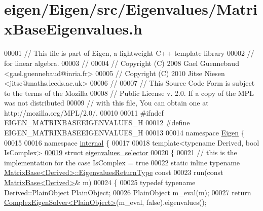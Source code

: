 \hypertarget{eigen_2_eigen_2src_2_eigenvalues_2_matrix_base_eigenvalues_8h_source}{}\section{eigen/\+Eigen/src/\+Eigenvalues/\+Matrix\+Base\+Eigenvalues.h}
\label{eigen_2_eigen_2src_2_eigenvalues_2_matrix_base_eigenvalues_8h_source}

\begin{DoxyCode}
00001 \textcolor{comment}{// This file is part of Eigen, a lightweight C++ template library}
00002 \textcolor{comment}{// for linear algebra.}
00003 \textcolor{comment}{//}
00004 \textcolor{comment}{// Copyright (C) 2008 Gael Guennebaud <gael.guennebaud@inria.fr>}
00005 \textcolor{comment}{// Copyright (C) 2010 Jitse Niesen <jitse@maths.leeds.ac.uk>}
00006 \textcolor{comment}{//}
00007 \textcolor{comment}{// This Source Code Form is subject to the terms of the Mozilla}
00008 \textcolor{comment}{// Public License v. 2.0. If a copy of the MPL was not distributed}
00009 \textcolor{comment}{// with this file, You can obtain one at http://mozilla.org/MPL/2.0/.}
00010 
00011 \textcolor{preprocessor}{#ifndef EIGEN\_MATRIXBASEEIGENVALUES\_H}
00012 \textcolor{preprocessor}{#define EIGEN\_MATRIXBASEEIGENVALUES\_H}
00013 
00014 \textcolor{keyword}{namespace }\hyperlink{namespace_eigen}{Eigen} \{ 
00015 
00016 \textcolor{keyword}{namespace }\hyperlink{namespaceinternal}{internal} \{
00017 
00018 \textcolor{keyword}{template}<\textcolor{keyword}{typename} Derived, \textcolor{keywordtype}{bool} IsComplex>
\hyperlink{struct_eigen_1_1internal_1_1eigenvalues__selector}{00019} \textcolor{keyword}{struct }\hyperlink{struct_eigen_1_1internal_1_1eigenvalues__selector}{eigenvalues\_selector}
00020 \{
00021   \textcolor{comment}{// this is the implementation for the case IsComplex = true}
00022   \textcolor{keyword}{static} \textcolor{keyword}{inline} \textcolor{keyword}{typename} \hyperlink{group___core___module_class_eigen_1_1_matrix}{MatrixBase<Derived>::EigenvaluesReturnType}
       \textcolor{keyword}{const}
00023   run(\textcolor{keyword}{const} \hyperlink{group___core___module_class_eigen_1_1_matrix_base}{MatrixBase<Derived>}& m)
00024   \{
00025     \textcolor{keyword}{typedef} \textcolor{keyword}{typename} Derived::PlainObject PlainObject;
00026     PlainObject m\_eval(m);
00027     \textcolor{keywordflow}{return} \hyperlink{group___eigenvalues___module_class_eigen_1_1_complex_eigen_solver}{ComplexEigenSolver<PlainObject>}(m\_eval, \textcolor{keyword}{false}).eigenvalues();

\end{DoxyCode}
